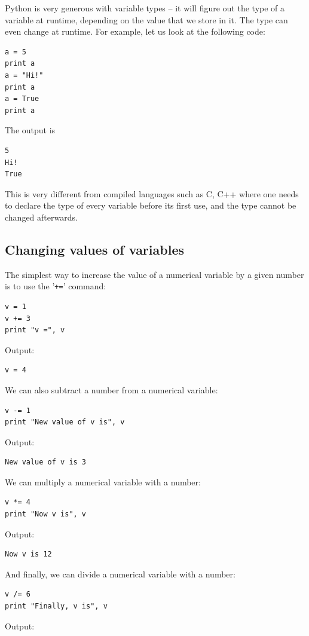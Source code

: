 Python is very generous with variable types -- it will figure out the type of a variable 
at runtime, depending on the value that we store in it. The type can even change at runtime.
For example, let us look at the following code:

\begin{verbatim}
a = 5
print a
a = "Hi!"
print a
a = True
print a
\end{verbatim}
The output is 

\begin{verbatim}
5
Hi!
True
\end{verbatim}
This is very different from compiled languages such as C, C++ where one needs to declare the type 
of every variable before its first use, and the type cannot be changed afterwards. 

\subsection{Changing values of variables}

The simplest way to increase the value of a numerical variable by a given number is to use the '{\tt +=}' 
command:

\begin{verbatim}
v = 1
v += 3
print "v =", v
\end{verbatim}
Output:

\begin{verbatim}
v = 4
\end{verbatim}
We can also subtract a number from a numerical variable:

\begin{verbatim}
v -= 1
print "New value of v is", v
\end{verbatim}
Output:

\begin{verbatim}
New value of v is 3
\end{verbatim}
We can multiply a numerical variable with a number:

\begin{verbatim}
v *= 4
print "Now v is", v
\end{verbatim}
Output:

\begin{verbatim}
Now v is 12
\end{verbatim}
And finally, we can divide a numerical variable with a number:

\begin{verbatim}
v /= 6
print "Finally, v is", v
\end{verbatim}
Output:

